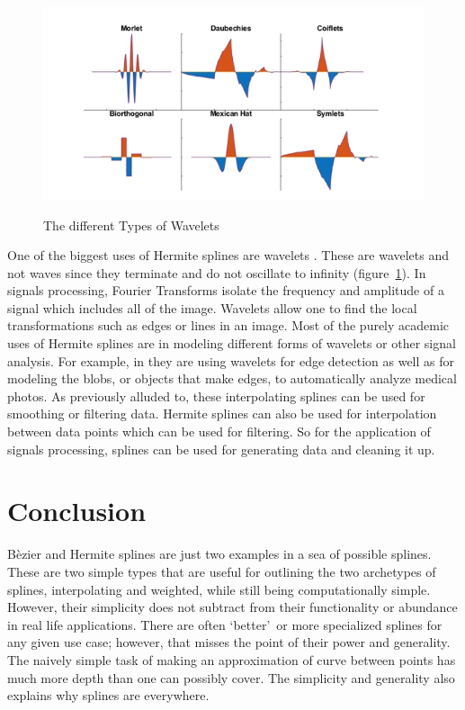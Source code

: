 \documentclass[12pt, letterpaper]{article}
\newcommand{\sorta}[1]{\lq #1\rq \,}
\begin{document}
\begin{figure}[ht]
  \centering
  \caption{The different Types of Wavelets}
  \includegraphics[width=\linewidth]{wavelets}
  \label{fig:waveletFig}
\end{figure}

One of the biggest uses of Hermite splines are wavelets \citep{HWavelets}. These are wavelets and not waves
since they terminate and do not oscillate to infinity (figure~\ref{fig:waveletFig}). In signals processing,
Fourier Transforms isolate the frequency and amplitude of a signal which includes all of the image. Wavelets
allow one to find the local transformations such as edges or lines in an image. Most of the purely academic
uses of
Hermite splines are in modeling different forms of wavelets or other signal analysis. For example, in
\cite{HBioMed} they are using wavelets for edge detection as well as for modeling the blobs, or objects that
make edges, to automatically analyze medical photos. As previously alluded to, these interpolating
splines can be used for smoothing or filtering data. Hermite splines can also be used for interpolation
between data points which can be used for filtering. So for the application of signals processing, splines
can be used for generating data and cleaning it up.

\section{Conclusion}
B\`ezier and Hermite splines are just two examples in a sea of possible splines. These are two simple types
that are useful for outlining the two archetypes of splines, interpolating and weighted, while still being
computationally simple. However, their simplicity does not subtract from their functionality or abundance in
real life applications. There are often \sorta{better} or more specialized splines for any given use case;
however, that misses the point of their power and generality. The naively simple task of making an
approximation of curve between points has much more depth than one can possibly cover. The simplicity and
generality also explains why splines are everywhere.
\end{document}
